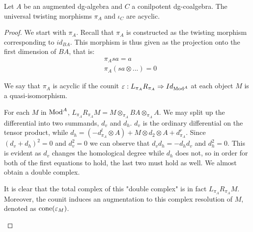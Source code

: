 \documentclass[../thesis.tex]{subfiles}
\begin{document}
            \begin{lemma}\label{lem: uni-twist-ac}
                Let $A$ be an augmented dg-algebra and $C$ a conilpotent dg-coalgebra. The universal twisting morphisms $\pi_A$ and $\iota_C$ are acyclic.
            \end{lemma}

            \begin{proof}
                We start with $\pi_A$. Recall that $\pi_A$ is constructed as the twisting morphism corresponding to $id_{BA}$. This morphism is thus given as the projection onto the first dimension of $BA$, that is:
                \begin{align*}
                    & \pi_A{sa} = a \\
                    & \pi_A(sa\otimes ...) = 0
                \end{align*}

                We say that $\pi_A$ is acyclic if the counit $\varepsilon : L_{\pi_A}R_{\pi_A} \Rightarrow Id_{\tt{Mod}^A}$ at each object $M$ is a quasi-isomorphism.

                For each $M$ in $\tt{Mod}^A$, $L_{\pi_A}R_{\pi_A}M = M\otimes_{\pi_A}BA\otimes_{\pi_A}A$. We may split up the differential into two summands, $d_v$ and $d_h$. $d_v$ is the ordinary differential on the tensor product, while $d_h = (-d^l_{\pi_A}\otimes A) + M\otimes d_2 \otimes A + d^r_{\pi_A}$. Since $(d_v + d_h)^2 = 0$ and $d_v^2 = 0$ we can observe that $d_vd_h = -d_hd_v$ and $d_h^2 = 0$. This is evident as $d_v$ changes the homological degree while $d_h$ does not, so in order for both of the first equations to hold, the last two must hold as well. We almost obtain a double complex.
                \begin{center}
                \end{center}
                It is clear that the total complex of this "double complex" is in fact $L_{\pi_A}R_{\pi_A}M$. Moreover, the counit induces an augmentation to this complex resolution of $M$, denoted as $\tt{cone}(\varepsilon_M)$. 
                \begin{center}
                \end{center}
                

\end{proof}
\end{document}
